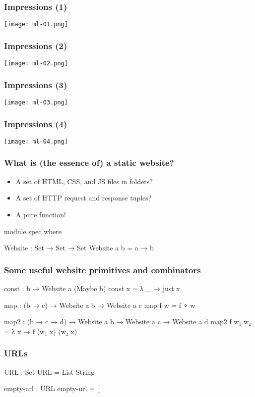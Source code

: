 \documentclass[aspectratio=169]{beamer}
\begin{document}
\begin{frame}
\frametitle{Impressions (1)}
\texttt{[image: ml-01.png]}
\end{frame}

\begin{frame}
\frametitle{Impressions (2)}
\texttt{[image: ml-02.png]}
\end{frame}

\begin{frame}
\frametitle{Impressions (3)}
\texttt{[image: ml-03.png]}
\end{frame}

\begin{frame}
\frametitle{Impressions (4)}
\texttt{[image: ml-04.png]}
\end{frame}

\begin{frame}
\frametitle{What is (the essence of) a static website?}
\begin{itemize}
  \item A set of HTML, CSS, and JS files in folders?
  \item A set of HTTP request and response tuples?
  \item A pure function!
\end{itemize}
\begin{code}
module spec where

  Website : Set → Set → Set
  Website a b = a → b
\end{code}
\end{frame}

\begin{frame}
\frametitle{Some useful website primitives and combinators}
\begin{code}
  const : b → Website a (Maybe b)
  const x = λ _ → just x
  
  map : (b → c) → Website a b → Website a c
  map f w = f ∘ w
  
  map2 : (b → c → d) → Website a b → Website a c → Website a d
  map2 f w₁ w₂ = λ x → f (w₁ x) (w₂ x)
\end{code}
\end{frame}

\begin{frame}
\frametitle{URLs}
\begin{code}
  URL : Set
  URL = List String

  empty-url : URL
  empty-url = []
\end{code}
\end{frame}
\end{document}
